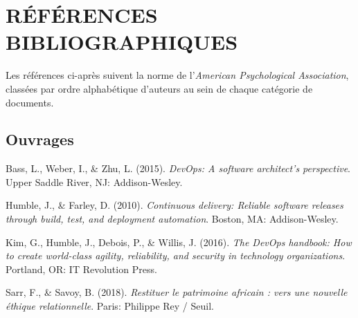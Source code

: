 \cleardoublepage
{}
\chapter*{RÉFÉRENCES BIBLIOGRAPHIQUES}

\newenvironment{apalist}
  {\begin{list}{}{%
     \setlength{\leftmargin}{1.27cm}%
     \setlength{\itemindent}{-1.27cm}%
     \setlength{\listparindent}{0pt}%
     \setlength{\itemsep}{0.45em}%
     \setlength{\parsep}{0pt}%
     \setlength{\topsep}{0.4em}}\setstretch{1.15}\sloppy}
  {\end{list}}

Les références ci-après suivent la norme de l'\emph{American Psychological
Association}, classées par ordre alphabétique d'auteurs au sein de chaque
catégorie de documents.

\section*{Ouvrages}

\begin{apalist}
\item Bass, L., Weber, I., \& Zhu, L. (2015). \emph{DevOps: A software
      architect's perspective}. Upper Saddle River, NJ: Addison-Wesley.

\item Humble, J., \& Farley, D. (2010). \emph{Continuous delivery: Reliable
      software releases through build, test, and deployment automation}. Boston,
      MA: Addison-Wesley.

\item Kim, G., Humble, J., Debois, P., \& Willis, J. (2016). \emph{The DevOps
      handbook: How to create world-class agility, reliability, and security in
      technology organizations}. Portland, OR: IT Revolution Press.

\item Sarr, F., \& Savoy, B. (2018). \emph{Restituer le patrimoine africain :
      vers une nouvelle éthique relationnelle}. Paris: Philippe Rey / Seuil.
\end{apalist}

